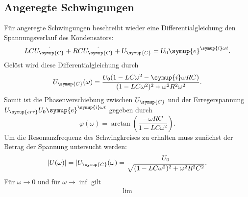 \subsection{Angeregte Schwingungen}
Für angeregte Schwingungen beschreibt wieder eine Differentialgleichung den Spannungsverlauf des Kondensators:
\begin{equation*}
    LC\dot{U_{\symup{C}}}+RC\dot{U_{\symup{C}}}+U_{\symup{C}} = U_0\symup{e}^{\symup{i}\omega t}.
\end{equation*}
Gelöst wird diese Differentialgleichung durch
\begin{equation*}
    U_{\symup{C}}(\omega)=\frac{U_0(1-LC\omega^2-\symup{i}\omega RC)}{(1-LC\omega^2)^{2}+\omega^2R^2\omega^2}.
\end{equation*}
Somit ist die Phasenverschiebung zwischen $U_{\symup{C}}$ und der Erregerspannung~$U_{\symup{err}}U_0\symup{e}^{\symup{i}\omega t}$
gegeben durch
\begin{equation}
    \varphi(\omega)=\arctan\left(\frac{-\omega RC}{1-LC\omega^2}\right).
    \label{eq:Phasenverschiebung}
\end{equation}
Um die Resonanzfrequenz des Schwingkreises zu erhalten muss zunächst der Betrag der Spannung untersucht werden:
\begin{equation*}
    |U(\omega)|=|U_{\symup{C}}(\omega) = \frac{U_0}{\sqrt{(1-LC\omega^2)^2+\omega^2R^2C^2}}.
\end{equation*}
Für $\omega \to 0$ und für $\omega \to \inf$ gilt
\begin{align*}
    \lim \limits_{}
\end{align*}